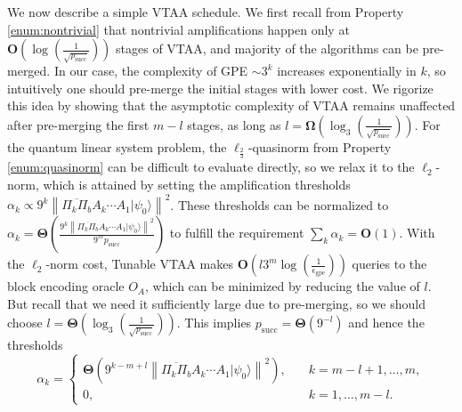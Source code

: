\documentclass[letterpaper,onecolumn,11pt,accepted=2026-02-14]{quantumarticle}
\newcommand{\norm}[1]{\left\lVert#1\right\rVert}
\theoremstyle{remark}
\theoremstyle{plain}
\newcommand{\ket}[1]{|#1\rangle}
\begin{document}
We now describe a simple VTAA schedule. We first recall from Property \ref{enum:nontrivial} that nontrivial amplifications happen only at $\mathbf{O}\left(\log\left(\frac{1}{\sqrt{p_{\text{succ}}}}\right)\right)$ stages of VTAA, and majority of the algorithms can be pre-merged. In our case, the complexity of GPE $\sim3^k$ increases exponentially in $k$, so intuitively one should pre-merge the initial stages with lower cost. We rigorize this idea by showing that the asymptotic complexity of VTAA remains unaffected after pre-merging the first $m-l$ stages, as long as $l=\mathbf{\Omega}\left(\log_3\left(\frac{1}{\sqrt{p_{\text{succ}}}}\right)\right)$. 
For the quantum linear system problem, the $\ell_{\frac{2}{3}}$-quasinorm from Property \ref{enum:quasinorm} can be difficult to evaluate directly, so we relax it to the $\ell_2$-norm, which is attained by setting the amplification thresholds $\alpha_k\propto 9^{k}\norm{\overline{\Pi_k\Pi_b}A_k\cdots A_1\ket{\psi_0}}^2$. These thresholds can be normalized to $\alpha_k=\mathbf{\Theta}\left(\frac{9^{k}\norm{\overline{\Pi_k\Pi_b}A_k\cdots A_1\ket{\psi_0}}^2}{9^m p_{\text{succ}}}\right)$ to fulfill the requirement $\sum_k\alpha_k=\mathbf{O}(1)$. With the $\ell_2$-norm cost, Tunable VTAA makes $\mathbf{O}\left(l3^m\log\left(\frac{1}{\epsilon_{\text{gpe}}}\right)\right)$ queries to the block encoding oracle $O_A$, which can be minimized by reducing the value of $l$. But recall that we need it sufficiently large due to pre-merging, so we should choose $l=\mathbf{\Theta}\left(\log_3\left(\frac{1}{\sqrt{p_{\text{succ}}}}\right)\right)$. This implies $p_{\text{succ}}=\mathbf{\Theta}\left(9^{-l}\right)$ and hence the thresholds
\begin{equation}
\label{eq:deterministic_threshold}
    \alpha_k=
    \begin{cases}
        \mathbf{\Theta}\left(9^{k-m+l}\norm{\overline{\Pi_k\Pi_b}A_k\cdots A_1\ket{\psi_0}}^2\right),\quad&k=m-l+1,\ldots,m,\\
        0,&k=1,\ldots,m-l.
    \end{cases}
\end{equation}
\end{document}
